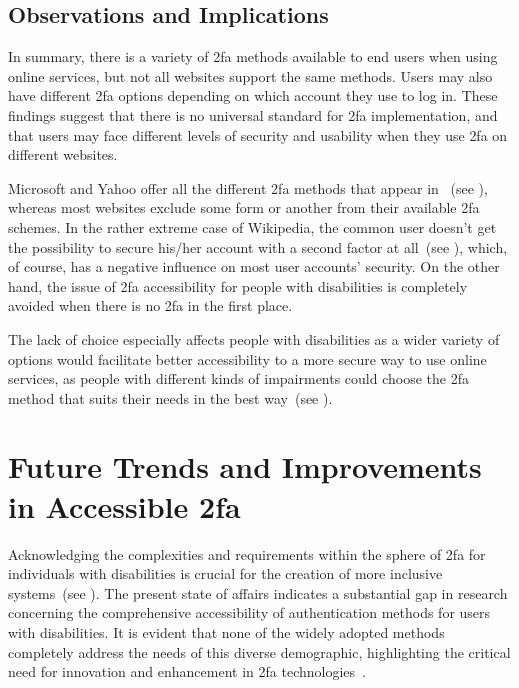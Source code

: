 \subsection{Observations and Implications}
\label{sec:choice:observations}

In summary, there is a variety of \ac{2fa} methods available to end users when using online services, but not all websites support the same methods. Users may also have different \ac{2fa} options depending on which account they use to log in. These findings suggest that there is no universal standard for \ac{2fa} implementation, and that users may face different levels of security and usability when they use \ac{2fa} on different websites. 

Microsoft and Yahoo offer all the different \ac{2fa} methods that appear in ~(see ), whereas most websites exclude some form or another from their available \ac{2fa} schemes. In the rather extreme case of Wikipedia, the common user doesn't get the possibility to secure his/her account with a second factor at all~(see ), which, of course, has a negative influence on most user accounts' security. On the other hand, the issue of \ac{2fa} accessibility for people with disabilities is completely avoided when there is no \ac{2fa} in the first place.

The lack of choice especially affects people with disabilities as a wider variety of options would facilitate better accessibility to a more secure way to use online services, as people with different kinds of impairments could choose the \ac{2fa} method that suits their needs in the best way~(see ).

\section{Future Trends and Improvements in Accessible \acs{2fa}}
\label{sec:future}

Acknowledging the complexities and requirements within the sphere of \ac{2fa} for individuals with disabilities is crucial for the creation of more inclusive systems~(see ). The present state of affairs indicates a substantial gap in research concerning the comprehensive accessibility of authentication methods for users with disabilities. It is evident that none of the widely adopted methods completely address the needs of this diverse demographic, highlighting the critical need for innovation and enhancement in \ac{2fa} technologies~\cite{erinola_2023}.


